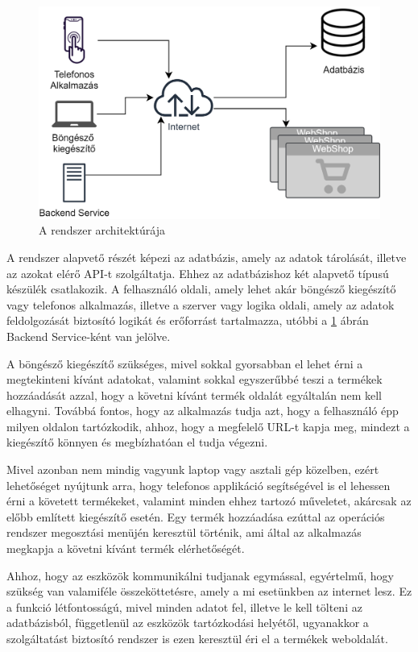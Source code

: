 \begin{figure}[H]
    \centering
    \includegraphics[scale=1.2]{figures/images/architecture_horizontal_HU.png}
    \caption{A rendszer architektúrája}
    \label{fig:architecture}
\end{figure}

A rendszer alapvető részét képezi az adatbázis, amely az adatok tárolását, illetve az azokat elérő API-t szolgáltatja. Ehhez az adatbázishoz két alapvető típusú készülék csatlakozik. A felhasználó oldali, amely lehet akár böngésző kiegészítő vagy telefonos alkalmazás, illetve a szerver vagy logika oldali, amely az adatok feldolgozását biztosító logikát és erőforrást tartalmazza, utóbbi a \ref{fig:architecture} ábrán Backend Service-ként van jelölve. 

A böngésző kiegészítő szükséges, mivel sokkal gyorsabban el lehet érni a megtekinteni kívánt adatokat, valamint sokkal egyszerűbbé teszi a termékek hozzáadását azzal, hogy a követni kívánt termék oldalát egyáltalán nem kell elhagyni. Továbbá fontos, hogy az alkalmazás tudja azt, hogy a felhasználó épp milyen oldalon tartózkodik, ahhoz, hogy a megfelelő URL-t kapja meg, mindezt a kiegészítő könnyen és megbízhatóan el tudja végezni.

Mivel azonban nem mindig vagyunk laptop vagy asztali gép közelben, ezért lehetőséget nyújtunk arra, hogy telefonos applikáció segítségével is el lehessen érni a követett termékeket, valamint minden ehhez tartozó műveletet, akárcsak az előbb említett kiegészítő esetén. Egy termék hozzáadása ezúttal az operációs rendszer megosztási menüjén keresztül történik, ami által az alkalmazás megkapja a követni kívánt termék elérhetőségét.

Ahhoz, hogy az eszközök kommunikálni tudjanak egymással, egyértelmű, hogy szükség van valamiféle összeköttetésre, amely a mi esetünkben az internet lesz. Ez a funkció létfontosságú, mivel minden adatot fel, illetve le kell tölteni az adatbázisból, függetlenül az eszközök tartózkodási helyétől, ugyanakkor a szolgáltatást biztosító rendszer is ezen keresztül éri el a termékek weboldalát.

